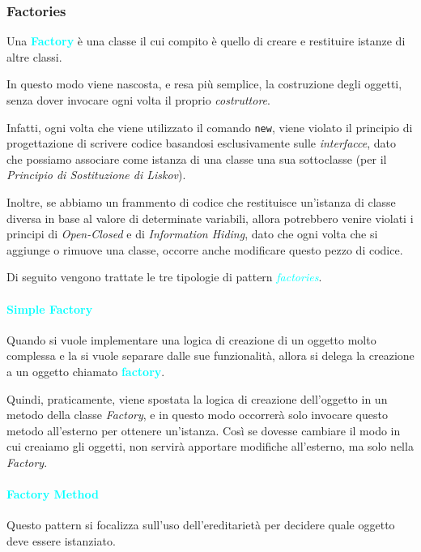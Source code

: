 \subsubsection{Factories}

Una \textbf{\textcolor{cyan}{Factory}} è una classe il cui compito
è quello di creare e restituire istanze di altre classi.

In questo modo viene nascosta, e resa più semplice, la costruzione degli oggetti,
senza dover invocare ogni volta il proprio \emph{costruttore}.

Infatti, ogni volta che viene utilizzato il comando \verb|new|, viene violato il
principio di progettazione di scrivere codice basandosi esclusivamente sulle \emph{interfacce}, 
dato che possiamo associare come istanza di una classe una sua sottoclasse (per il \emph{Principio di Sostituzione di Liskov}).

Inoltre, se abbiamo un frammento di codice che restituisce un'istanza di classe
diversa in base al valore di determinate variabili, allora potrebbero venire violati
i principi di \emph{Open-Closed} e di \emph{Information Hiding}, dato che ogni volta che si
aggiunge o rimuove una classe, occorre anche modificare questo pezzo di codice.

Di seguito vengono trattate le tre tipologie di pattern \emph{\textcolor{cyan}{factories}}.

\paragraph{\textcolor{cyan}{Simple Factory}} Quando si vuole implementare
una logica di creazione di un oggetto molto complessa e la si vuole separare dalle
sue funzionalità, allora si delega la creazione a un oggetto chiamato \textbf{\textcolor{cyan}{factory}}.

Quindi, praticamente, viene spostata la logica di creazione dell'oggetto in un metodo della classe
\emph{Factory}, e in questo modo occorrerà solo invocare questo metodo all'esterno per ottenere un'istanza.
Così se dovesse cambiare il modo in cui creaiamo gli oggetti, non servirà apportare modifiche all'esterno, ma solo
nella \emph{Factory}.

\paragraph{\textcolor{cyan}{Factory Method}} Questo pattern si focalizza sull'uso dell'ereditarietà
per decidere quale oggetto deve essere istanziato.

